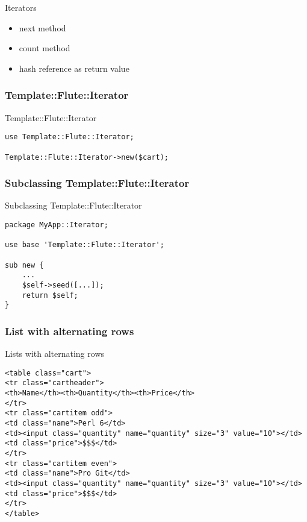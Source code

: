 \begin{frame}{Iterators}
\begin{itemize}
  \item next method
  \item count method
  \item hash reference as return value
 \end{itemize}
\end{frame}

\subsubsection{Template::Flute::Iterator}
\begin{frame}[fragile]{Template::Flute::Iterator}
\begin{lstlisting}
use Template::Flute::Iterator;

Template::Flute::Iterator->new($cart);
\end{lstlisting}
\end{frame}

\subsubsection{Subclassing Template::Flute::Iterator}
\begin{frame}[fragile]{Subclassing Template::Flute::Iterator}
\begin{lstlisting}
package MyApp::Iterator;

use base 'Template::Flute::Iterator';

sub new {
    ...
    $self->seed([...]);
    return $self;
}
\end{lstlisting}
\end{frame}

\subsubsection{List with alternating rows}
\begin{frame}[fragile]{Lists with alternating rows}
\begin{lstlisting}
<table class="cart">
<tr class="cartheader">
<th>Name</th><th>Quantity</th><th>Price</th>
</tr>
<tr class="cartitem odd">
<td class="name">Perl 6</td>
<td><input class="quantity" name="quantity" size="3" value="10"></td>
<td class="price">$$$</td>
</tr>
<tr class="cartitem even">
<td class="name">Pro Git</td>
<td><input class="quantity" name="quantity" size="3" value="10"></td>
<td class="price">$$$</td>
</tr>
</table>
\end{lstlisting}
\end{frame}

